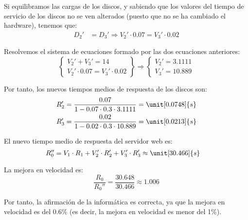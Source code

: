 \begin{ejercicio}
\begin{enumerate}
        Si equilibramos las cargas de los discos, y sabiendo que los valores del tiempo de servicio de los discos no se ven alterados (puesto que no se ha cambiado el hardware), tenemos que:
        \begin{align*}
            D_2' &= D_3' \Longrightarrow V_2' \cdot 0.07 = V_3' \cdot 0.02
        \end{align*}

        Resolvemos el sistema de ecuaciones formado por las dos ecuaciones anteriores:
        \begin{equation*}
            \left\{\begin{array}{l}
                V_2' + V_3' = 14 \\
                V_2' \cdot 0.07 = V_3' \cdot 0.02
            \end{array}\right\}
            \Longrightarrow \left\{\begin{array}{l}
                V_2' = 3.1111\\
                V_3' = 10.889
            \end{array}\right.
        \end{equation*}

        Por tanto, los nuevos tiempos medios de respuesta de los discos son:
        \begin{align*}
            R_2' &= \dfrac{0.07}{1 - 0.07 \cdot 0.3 \cdot 3.1111} = \unit[0.0748]{s} \\
            R_3' &= \dfrac{0.02}{1 - 0.02 \cdot 0.3 \cdot 10.889} = \unit[0.0213]{s}
        \end{align*}

        El nuevo tiempo medio de respuesta del servidor web es:
        \begin{align*}
            R_0'' &= V_1 \cdot R_1 + V_2' \cdot R_2' + V_3' \cdot R_3' \approx \unit[30.466]{s}
        \end{align*}

        La mejora en velocidad es:
        \begin{equation*}
            \dfrac{R_0}{R_0''} = \dfrac{30.648}{30.466} \approx 1.006
        \end{equation*}

        Por tanto, la afirmación de la informática es correcta, ya que la mejora en velocidad es del 0.6\% (es decir, la mejora en velocidad es menor del 1\%).
    \end{enumerate}
    
\end{ejercicio}
\begin{comment}
\solucion
    Las dos predicciones son correctas. En el primer caso la mejora en velocidad obtenida es 12.2 (1120\%) (1114\% si usamos todos los decimales en los cálculos) y en el segundo 1.006 (0.6\%). Las nuevas razones de visita de los discos A y B serían, en el segundo caso, 3.1 y 10.9 respectivamente.
\end{comment}

